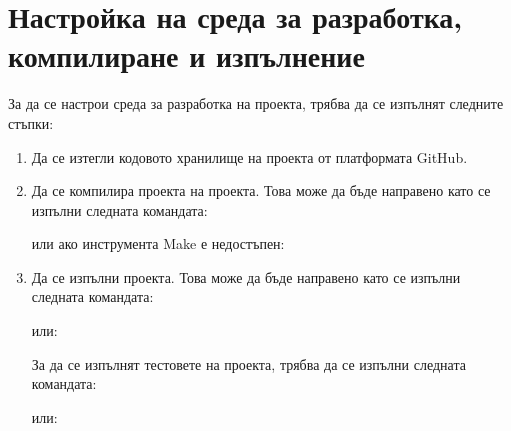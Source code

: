 \section{Настройка на среда за разработка, компилиране и изпълнение}
За да се настрои среда за разработка на проекта, трябва да се изпълнят следните стъпки:
\begin{enumerate}
    \item Да се изтегли кодовото хранилище на проекта от платформата GitHub.
    

    \item Да се компилира проекта на проекта. Това може да бъде направено като се изпълни следната командата:
    
    или ако инструмента Make е недостъпен:
    

    \item Да се изпълни проекта. Това може да бъде направено като се изпълни следната командата:
    
    или:
    

    За да се изпълнят тестовете на проекта, трябва да се изпълни следната командата:
    
    или:
    
\end{enumerate}